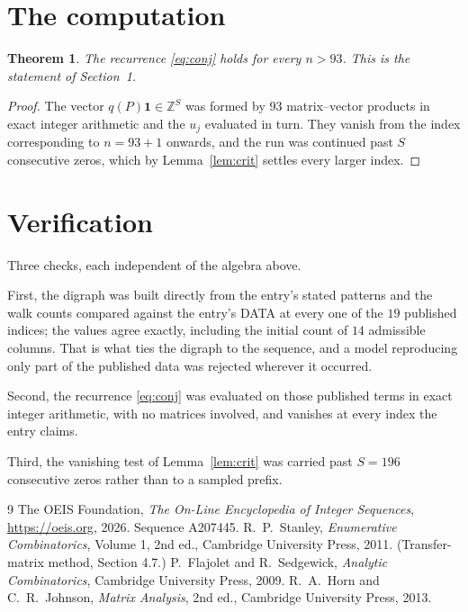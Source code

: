 \documentclass[11pt,a4paper]{article}
\theoremstyle{plain}
\newtheorem{theorem}{Theorem}
\theoremstyle{definition}
\begin{document}
\section{The computation}

\begin{theorem}
The recurrence \eqref{eq:conj} holds for every $n>93$. This is the statement of
Section~1.
\end{theorem}

\begin{proof}
The vector $q(P)\mathbf{1}\in\mathbb{Z}^{S}$ was formed by $93$ matrix--vector
products in exact integer arithmetic and the $u_j$ evaluated in turn. They vanish from the
index corresponding to $n=93+1$ onwards, and the run was continued past $S$ consecutive
zeros, which by Lemma~\ref{lem:crit} settles every larger index.
\end{proof}

\section{Verification}

Three checks, each independent of the algebra above.

First, the digraph was built directly from the entry's stated patterns and the walk counts
compared against the entry's DATA at every one of the $19$ published indices; the
values agree exactly, including the initial count of $14$ admissible columns. That is
what ties the digraph to the sequence, and a model reproducing only part of the published
data was rejected wherever it occurred.

Second, the recurrence \eqref{eq:conj} was evaluated on those published terms in exact
integer arithmetic, with no matrices involved, and vanishes at every index the entry claims.

Third, the vanishing test of Lemma~\ref{lem:crit} was carried past $S=196$ consecutive
zeros rather than to a sampled prefix.

\begin{thebibliography}{9}
 The OEIS Foundation, \emph{The On-Line Encyclopedia of Integer
Sequences}, \url{https://oeis.org}, 2026. Sequence A207445.
 R.~P.~Stanley, \emph{Enumerative Combinatorics}, Volume 1, 2nd ed.,
Cambridge University Press, 2011. (Transfer-matrix method, Section 4.7.)
 P.~Flajolet and R.~Sedgewick, \emph{Analytic Combinatorics}, Cambridge
University Press, 2009.
 R.~A.~Horn and C.~R.~Johnson, \emph{Matrix Analysis}, 2nd ed., Cambridge
University Press, 2013.
\end{thebibliography}
\end{document}
